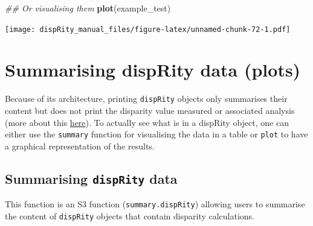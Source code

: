 \documentclass[
]{book}
\newenvironment{Shaded}{\begin{snugshade}}{\end{snugshade}}
\newcommand{\CommentTok}[1]{\textcolor[rgb]{0.56,0.35,0.01}{\textit{#1}}}
\newcommand{\KeywordTok}[1]{\textcolor[rgb]{0.13,0.29,0.53}{\textbf{#1}}}
\newcommand{\NormalTok}[1]{#1}
\begin{document}
\begin{Shaded}
\begin{Highlighting}[]
\CommentTok{\#\# Or visualising them}
\KeywordTok{plot}\NormalTok{(example\_test)}
\end{Highlighting}
\end{Shaded}

\texttt{[image: dispRity\_manual\_files/figure-latex/unnamed-chunk-72-1.pdf]}

\hypertarget{summarising-disprity-data-plots}{%
\section{Summarising dispRity data (plots)}\label{summarising-disprity-data-plots}}

Because of its architecture, printing \texttt{dispRity} objects only summarises their content but does not print the disparity value measured or associated analysis (more about this \protect\hyperlink{manipulating-dispRity-objects}{here}).
To actually see what is in a dispRity object, one can either use the \texttt{summary} function for visualising the data in a table or \texttt{plot} to have a graphical representation of the results.

\hypertarget{summarising-disprity-data}{%
\subsection{\texorpdfstring{Summarising \texttt{dispRity} data}{Summarising dispRity data}}\label{summarising-disprity-data}}

This function is an S3 function (\texttt{summary.dispRity}) allowing users to summarise the content of \texttt{dispRity} objects that contain disparity calculations.
\end{document}
